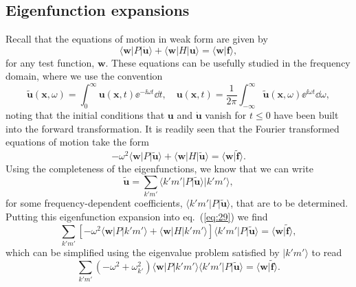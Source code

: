 \subsection*{Eigenfunction expansions}

Recall that the equations of motion in weak form are given by
\begin{equation}
\langle \mathbf{w}|P|\ddot{\mathbf{u}}\rangle+\langle \mathbf{w}|H|\mathbf{u}\rangle=\langle \mathbf{w}|\mathbf{f}\rangle,
\label{eq:27}
\end{equation}
for any test function, $\mathbf{w}$. These equations can be usefully studied in the frequency domain, 
where we use the convention
\begin{equation}
\tilde{\mathbf{u}}(\mathbf{x},\omega)=\int_{0}^{\infty}\mathbf{u}(\mathbf{x},t)\ee^{-\ii\omega t}\dd t,
 \quad \mathbf{u}(\mathbf{x},t)=\frac{1}{2\pi}\int_{-\infty}^{\infty}\tilde{\mathbf{u}}(\mathbf{x},\omega)\ee^{\ii\omega t}\dd\omega,
\label{eq:28}
\end{equation}
noting that the initial conditions that $\mathbf{u}$ and $\dot{\mathbf{u}}$ vanish for $t\le 0$ have been built into the forward transformation. It is 
readily seen that the Fourier transformed equations of motion take the form
\begin{equation}
-\omega^{2}\langle \mathbf{w}|P|\tilde{\mathbf{u}}\rangle+\langle \mathbf{w}|H|\tilde{\mathbf{u}}\rangle=\langle \mathbf{w}|\tilde{\mathbf{f}}\rangle.
\label{eq:29}
\end{equation}
Using the completeness of the eigenfunctions, we know that we can write
\begin{equation}
\tilde{\mathbf{u}}=\sum_{k'm'}\langle k'm'|P|\tilde{\mathbf{u}}\rangle|k'm'\rangle,
\label{eq:30}
\end{equation}
for some frequency-dependent coefficients, $\langle k'm'|P|\tilde{\mathbf{u}}\rangle$, that are to be determined. Putting this eigenfunction expansion into eq.~(\ref{eq:29}) we find
\begin{equation}
\sum_{k'm'}[-\omega^{2}\langle \mathbf{w}|P|k'm'\rangle+\langle \mathbf{w}|H|k'm'\rangle]\langle k'm'|P|\tilde{\mathbf{u}}\rangle=\langle \mathbf{w}|\tilde{\mathbf{f}}\rangle,
\label{eq:31}
\end{equation}
which can be simplified using the eigenvalue problem satisfied by $|k'm'\rangle$ to read
\begin{equation}
\sum_{k'm'}(-\omega^{2}+\omega_{k'}^{2})\langle \mathbf{w}|P|k'm'\rangle\langle k'm'|P|\tilde{\mathbf{u}}\rangle=\langle \mathbf{w}|\tilde{\mathbf{f}}\rangle.
\label{eq:32}
\end{equation}

